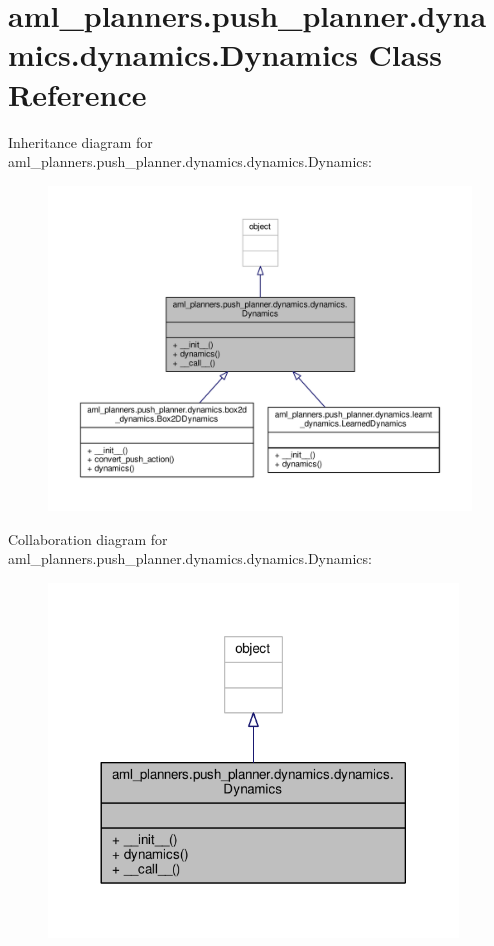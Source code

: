 \hypertarget{classaml__planners_1_1push__planner_1_1dynamics_1_1dynamics_1_1_dynamics}{\section{aml\-\_\-planners.\-push\-\_\-planner.\-dynamics.\-dynamics.\-Dynamics Class Reference}
\label{classaml__planners_1_1push__planner_1_1dynamics_1_1dynamics_1_1_dynamics}
}


Inheritance diagram for aml\-\_\-planners.\-push\-\_\-planner.\-dynamics.\-dynamics.\-Dynamics\-:
\nopagebreak
\begin{figure}[H]
\begin{center}
\leavevmode
\includegraphics[width=350pt]{classaml__planners_1_1push__planner_1_1dynamics_1_1dynamics_1_1_dynamics__inherit__graph}
\end{center}
\end{figure}


Collaboration diagram for aml\-\_\-planners.\-push\-\_\-planner.\-dynamics.\-dynamics.\-Dynamics\-:
\nopagebreak
\begin{figure}[H]
\begin{center}
\leavevmode
\includegraphics[width=308pt]{classaml__planners_1_1push__planner_1_1dynamics_1_1dynamics_1_1_dynamics__coll__graph}
\end{center}
\end{figure}

